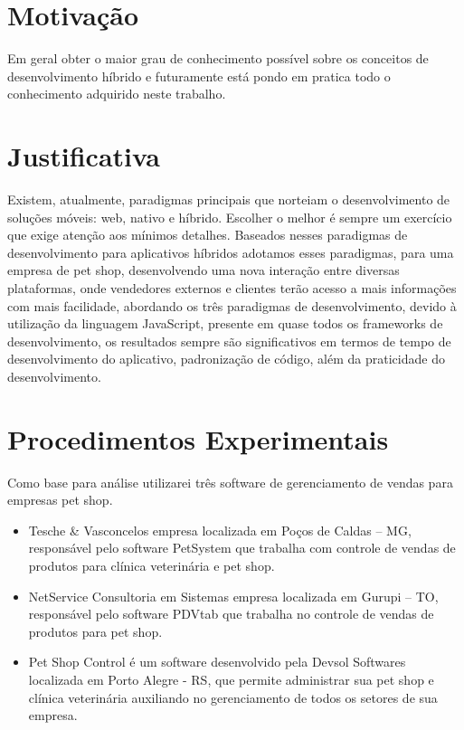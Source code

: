 \documentclass[12pt,openright,twoside,a4paper,english,french,spanish,brazil]{abntex2}
\begin{document}
\section*{Motivação}
Em geral obter o maior grau de conhecimento possível sobre os conceitos de desenvolvimento híbrido e futuramente está pondo em pratica todo o conhecimento adquirido neste trabalho. 

\section*{Justificativa}
Existem, atualmente, paradigmas principais que norteiam o desenvolvimento de soluções móveis: web, nativo e híbrido. Escolher o melhor é sempre um exercício que exige atenção aos mínimos detalhes.
Baseados nesses paradigmas de desenvolvimento para aplicativos híbridos adotamos esses paradigmas, para uma empresa de pet shop, desenvolvendo uma nova interação entre diversas plataformas, onde vendedores externos e clientes terão acesso a mais informações com mais facilidade, abordando os três paradigmas de desenvolvimento, devido à utilização da linguagem JavaScript, presente em quase todos os frameworks de desenvolvimento, os resultados sempre são significativos em termos de tempo de desenvolvimento do aplicativo, padronização de código, além da praticidade do desenvolvimento.


\section*{Procedimentos Experimentais}

Como base para análise utilizarei três software de gerenciamento de vendas para empresas pet shop.

\begin{itemize}
\item Tesche \& Vasconcelos empresa localizada em Poços de Caldas – MG, responsável pelo software PetSystem que trabalha com controle de vendas de produtos para clínica veterinária e pet shop.
\item NetService Consultoria em Sistemas empresa localizada em Gurupi – TO, responsável pelo software PDVtab que trabalha no controle de vendas de produtos para pet shop.
\item Pet Shop Control é um software desenvolvido pela Devsol Softwares localizada em Porto Alegre - RS, que permite administrar sua pet shop e clínica veterinária auxiliando no gerenciamento de todos os setores de sua empresa.
\end{itemize}
\end{document}
